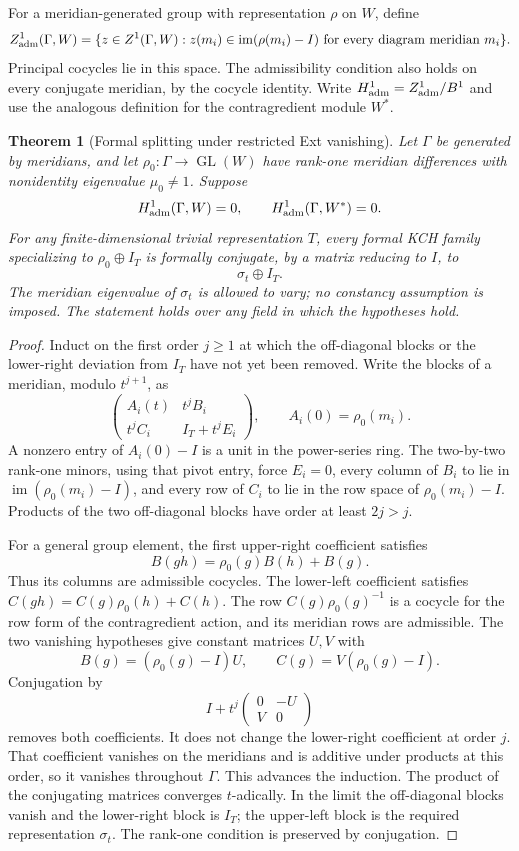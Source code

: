 \documentclass[11pt]{article}
\newtheorem{theorem}{Theorem}
\newcommand{\im}{\operatorname{im}}
\newcommand{\GL}{\operatorname{GL}}
\begin{document}
For a meridian-generated group with representation $\rho$ on $W$,
define
\[
 Z^1_{\rm adm}(\Gamma,W)=
 \{z\in Z^1(\Gamma,W):z(m_i)\in\im(\rho(m_i)-I)
 \text{ for every diagram meridian }m_i\}.
\]
Principal cocycles lie in this space. The admissibility condition
also holds on every conjugate meridian, by the cocycle identity.
Write $H^1_{\rm adm}=Z^1_{\rm adm}/B^1$ and use the analogous
definition for the contragredient module $W^*$.

\begin{theorem}[Formal splitting under restricted Ext vanishing]\label{thm:split}
Let $\Gamma$ be generated by meridians, and let
$\rho_0:\Gamma\to\GL(W)$ have rank-one meridian differences with
nonidentity eigenvalue $\mu_0\ne1$. Suppose
\[
 H^1_{\rm adm}(\Gamma,W)=0,
 \qquad H^1_{\rm adm}(\Gamma,W^*)=0.
\]
For any finite-dimensional trivial representation $T$, every
formal KCH family specializing to $\rho_0\oplus I_T$ is formally
conjugate, by a matrix reducing to $I$, to
\[
 \sigma_t\oplus I_T.
\]
The meridian eigenvalue of $\sigma_t$ is allowed to vary; no
constancy assumption is imposed. The statement holds over any field in which the
hypotheses hold.
\end{theorem}
\begin{proof}
Induct on the first order $j\ge1$ at which the off-diagonal blocks
or the lower-right deviation from $I_T$ have not yet been removed.
Write the blocks of a meridian, modulo $t^{j+1}$, as
\[
 \begin{pmatrix} A_i(t)&t^jB_i\\t^jC_i&I_T+t^jE_i\end{pmatrix},
 \qquad A_i(0)=\rho_0(m_i).
\]
A nonzero entry of $A_i(0)-I$ is a unit in the power-series ring.
The two-by-two rank-one minors, using that pivot entry, force
$E_i=0$, every column of $B_i$ to lie in
$\im(\rho_0(m_i)-I)$, and every row of $C_i$ to lie in the row
space of $\rho_0(m_i)-I$. Products of the two off-diagonal blocks
have order at least $2j>j$.

For a general group element, the first upper-right coefficient
satisfies
\[
 B(gh)=\rho_0(g)B(h)+B(g).
\]
Thus its columns are admissible cocycles. The lower-left
coefficient satisfies $C(gh)=C(g)\rho_0(h)+C(h)$.
The row $C(g)\rho_0(g)^{-1}$ is a cocycle for the row form of the
contragredient action, and its meridian rows are admissible.
The two vanishing hypotheses give constant matrices $U,V$ with
\[
 B(g)=(\rho_0(g)-I)U,\qquad
 C(g)=V(\rho_0(g)-I).
\]
Conjugation by
\[
 I+t^j\begin{pmatrix}0&-U\\V&0\end{pmatrix}
\]
removes both coefficients. It does not change the lower-right
coefficient at order $j$. That coefficient vanishes on the
meridians and is additive under products at this order, so it
vanishes throughout $\Gamma$. This advances the induction.
The product of the conjugating matrices converges $t$-adically.
In the limit the off-diagonal blocks vanish and the lower-right
block is $I_T$; the upper-left block is the required representation
$\sigma_t$. The rank-one condition is preserved by conjugation.
\end{proof}
\end{document}
